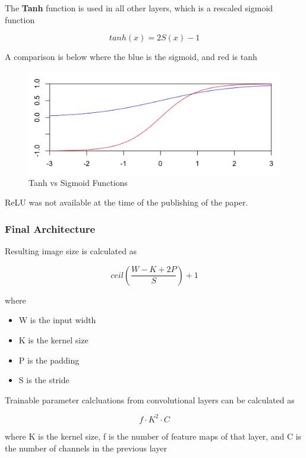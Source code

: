\documentclass[11pt]{article}
\theoremstyle{definition}
\begin{document}
The \textbf{Tanh} function is used in all other layers, which is a rescaled sigmoid function

\[ tanh(x) = 2 S(x) - 1 \]

A comparison is below where the blue is the sigmoid, and red is tanh

\begin{figure}[H]
\begin{center}
  \includegraphics[width=\linewidth,keepaspectratio]{images/tanhvssigmoid.png}
  \caption{Tanh vs Sigmoid Functions}
\end{center}
\end{figure}

ReLU was not available at the time of the publishing of the paper. 

\subsubsection{Final Architecture}




Resulting image size is calculated as 

\begin{equation}
 ceil\left(\frac{W-K+2P}{S}\right) + 1
 \end{equation}

where

\begin{itemize}
\item W is the input width
\item K is the kernel size
\item P is the padding
\item S is the stride
\end{itemize}

Trainable parameter calcluations from convolutional layers can be calculated as

\[ f \cdot K^{2} \cdot C\]

where K is the kernel size, f is the number of feature maps of that layer, and C is the number of channels in the previous layer
\end{document}
